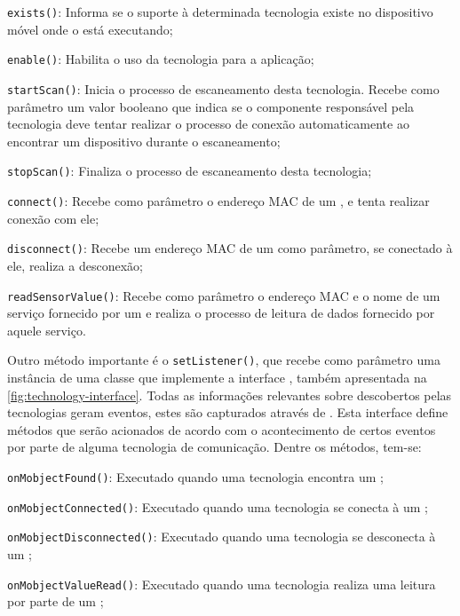 \begin{alineas}
	\item \texttt{exists()}: Informa se o suporte à determinada tecnologia existe no dispositivo móvel onde o \middleware está executando;

	\item \texttt{enable()}: Habilita o uso da tecnologia para a aplicação;

	\item \texttt{startScan()}: Inicia o processo de escaneamento desta tecnologia. Recebe como parâmetro um valor booleano que indica se o componente responsável pela tecnologia deve tentar realizar o processo de conexão automaticamente ao encontrar um dispositivo durante o escaneamento;

	\item \texttt{stopScan()}: Finaliza o processo de escaneamento desta tecnologia;

	\item \texttt{connect()}: Recebe como parâmetro o endereço MAC de um \smartobj, e tenta realizar conexão com ele;

	\item \texttt{disconnect()}: Recebe um endereço MAC de um \smartobj como parâmetro, se conectado à ele, realiza a desconexão;

	\item \texttt{readSensorValue()}: Recebe como parâmetro o endereço MAC e o nome de um serviço fornecido por um \smartobj e realiza o processo de leitura de dados fornecido por aquele serviço.
\end{alineas}

Outro método importante é o \texttt{setListener()}, que recebe como parâmetro uma instância de uma classe que implemente a interface \techlistener, também apresentada na \autoref{fig:technology-interface}.
Todas as informações relevantes sobre \smartobjs descobertos pelas tecnologias geram eventos, estes são capturados através de \techlistener.
Esta interface define métodos que serão acionados de acordo com o acontecimento de certos eventos por parte de alguma tecnologia de comunicação.
Dentre os métodos, tem-se:

\begin{alineas}
	\item \texttt{onMobjectFound()}: Executado quando uma tecnologia encontra um \smartobj;

	\item \texttt{onMobjectConnected()}: Executado quando uma tecnologia se conecta à um \smartobj;

	\item \texttt{onMobjectDisconnected()}: Executado quando uma tecnologia se desconecta à um \smartobj;

	\item \texttt{onMobjectValueRead()}: Executado quando uma tecnologia realiza uma leitura por parte de um \smartobj;
\end{alineas}

